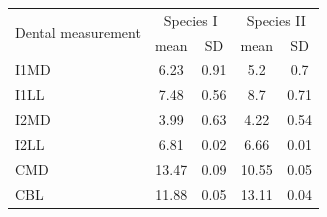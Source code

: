 \begin{table}
\centering
\label{table:good_table}
\begin{tabular}{l c c c c}
\toprule
\multirow{2}{*}{Dental measurement} & \multicolumn{2}{c}{Species I} & \multicolumn{2}{c}{Species II} \\ 
\cmidrule{2-5}
  & mean & SD  & mean & SD  \\ 
\midrule
I1MD & 6.23 & 0.91 & 5.2  & 0.7  \\

I1LL & 7.48 & 0.56 & 8.7  & 0.71 \\

I2MD & 3.99 & 0.63 & 4.22 & 0.54 \\

I2LL & 6.81 & 0.02 & 6.66 & 0.01 \\

CMD & 13.47 & 0.09 & 10.55 & 0.05 \\

CBL & 11.88 & 0.05 & 13.11 & 0.04\\ 
\bottomrule
\end{tabular}
\end{table}

